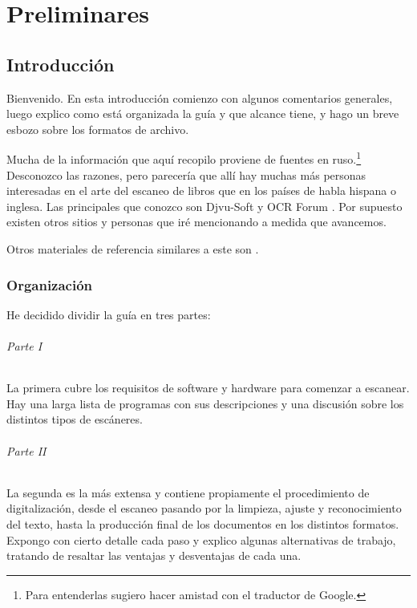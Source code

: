 \documentclass[%
	a5paper,
	10pt,
	twoside,
	openright,
	final,
]{memoir}
\begin{document}
{	\part{Preliminares}

	\chapter{Introducción} Bienvenido. En esta introducción comienzo con algunos comentarios generales, luego explico como está organizada la guía y que alcance tiene, y hago un breve esbozo sobre los formatos de archivo.

	Mucha de la información que aquí recopilo proviene de fuentes en ruso.\footnote{Para entenderlas sugiero hacer amistad con el traductor de Google.} Desconozco las razones, pero parecería que allí hay muchas más personas interesadas en el arte del escaneo de libros que en los países de habla hispana o inglesa. Las principales que conozco son Djvu-Soft \cite{DjvuSoft} y OCR Forum \cite{OCRForum}. Por supuesto existen otros sitios y personas que iré mencionando a medida que avancemos.

	Otros materiales de referencia similares a este son \cite{WikimediaCreatingDjVu, ScanAndShare2008, HowToMakeDjVu, rutrackertwdragon, ALinuxGuideToBookScanning, LIBRITOS}.

	\section{Organización} He decidido dividir la guía en tres partes:

	\paragraph{Parte I} La primera cubre los requisitos de software y hardware para comenzar a escanear. Hay una larga lista de programas con sus descripciones y una discusión sobre los distintos tipos de escáneres.

	\paragraph{Parte II} La segunda es la más extensa y contiene propiamente el procedimiento de digitalización, desde el escaneo pasando por la limpieza, ajuste y reconocimiento del texto, hasta la producción final de los documentos en los distintos formatos. Expongo con cierto detalle cada paso y explico algunas alternativas de trabajo, tratando de resaltar las ventajas y desventajas de cada una.

}
\end{document}

